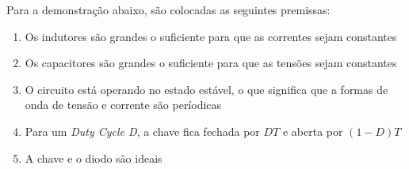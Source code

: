\noindent
\begin{minipage}{\linewidth}
\label{sepic_topology_closed_sample}
\end{minipage}

\noindent
\begin{minipage}{\linewidth}
\label{sepic_topology_open_sample}
\end{minipage}

Para a demonstração abaixo, são colocadas as seguintes premissas:
\begin{enumerate}
    \item Os indutores são grandes o suficiente para que as correntes sejam constantes
    \item Os capacitores são grandes o suficiente para que as tensões sejam constantes
    \item O circuito está operando no estado estável, o que significa que a formas de onda de tensão e corrente são períodicas
    \item Para um \textit{Duty Cycle D}, a chave fica fechada por \textit{$DT$} e aberta por \textit{$(1 - D)T$}
    \item A chave e o diodo são ideais
\end{enumerate}

